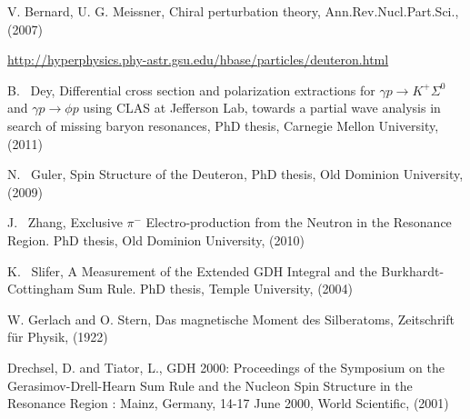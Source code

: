         V. Bernard, U. G. Meissner, Chiral perturbation theory, 
        Ann.Rev.Nucl.Part.Sci., (2007)


 \href{http://hyperphysics.phy-astr.gsu.edu/hbase/particles/deuteron.html}{http://hyperphysics.phy-astr.gsu.edu/hbase/particles/deuteron.html}

 B. ~Dey, Differential cross section and polarization extractions for $\gamma p \rightarrow K^{+} \Sigma^{0}$ and $\gamma p \rightarrow \phi p$ using CLAS at Jefferson Lab, towards a partial wave analysis in search of missing baryon resonances, PhD thesis, Carnegie Mellon University, (2011) %

 N. ~Guler, Spin Structure of the Deuteron, PhD thesis, Old Dominion University, (2009)

 J. ~Zhang, Exclusive $\pi^-$ Electro-production from the Neutron in the Resonance Region. PhD thesis, Old Dominion University, (2010)

 K. ~Slifer, A Measurement of the Extended GDH Integral and the Burkhardt-Cottingham Sum Rule. PhD thesis, Temple University, (2004)  


        W. Gerlach and O. Stern,         Das magnetische Moment des Silberatoms,
        Zeitschrift für Physik, (1922)

        Drechsel, D. and Tiator, L.,
        GDH 2000: Proceedings of the Symposium on the Gerasimov-Drell-Hearn Sum Rule and the Nucleon Spin Structure in the Resonance Region : Mainz, Germany, 14-17 June 2000,  
        World Scientific, (2001)
     
